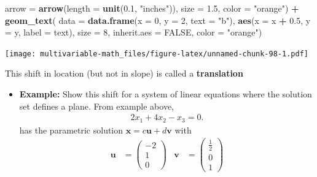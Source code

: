 \documentclass[
]{book}
\newenvironment{Shaded}{\begin{snugshade}}{\end{snugshade}}
\newcommand{\DataTypeTok}[1]{\textcolor[rgb]{0.13,0.29,0.53}{#1}}
\newcommand{\DecValTok}[1]{\textcolor[rgb]{0.00,0.00,0.81}{#1}}
\newcommand{\FloatTok}[1]{\textcolor[rgb]{0.00,0.00,0.81}{#1}}
\newcommand{\KeywordTok}[1]{\textcolor[rgb]{0.13,0.29,0.53}{\textbf{#1}}}
\newcommand{\NormalTok}[1]{#1}
\newcommand{\OperatorTok}[1]{\textcolor[rgb]{0.81,0.36,0.00}{\textbf{#1}}}
\newcommand{\OtherTok}[1]{\textcolor[rgb]{0.56,0.35,0.01}{#1}}
\newcommand{\StringTok}[1]{\textcolor[rgb]{0.31,0.60,0.02}{#1}}
\providecommand{\tightlist}{%
  \setlength{\itemsep}{0pt}\setlength{\parskip}{0pt}}
\theoremstyle{definition}
\theoremstyle{definition}
\theoremstyle{definition}
\theoremstyle{remark}
\begin{document}
\begin{Shaded}
\begin{Highlighting}[]
        \DataTypeTok{arrow =} \KeywordTok{arrow}\NormalTok{(}\DataTypeTok{length =} \KeywordTok{unit}\NormalTok{(}\FloatTok{0.1}\NormalTok{, }\StringTok{"inches"}\NormalTok{)), }
        \DataTypeTok{size =} \FloatTok{1.5}\NormalTok{, }\DataTypeTok{color =} \StringTok{"orange"}\NormalTok{) }\OperatorTok{+}
\StringTok{    }\KeywordTok{geom_text}\NormalTok{(}
        \DataTypeTok{data =} \KeywordTok{data.frame}\NormalTok{(}\DataTypeTok{x =} \DecValTok{0}\NormalTok{, }\DataTypeTok{y =} \DecValTok{2}\NormalTok{, }\DataTypeTok{text =} \StringTok{"b"}\NormalTok{),}
        \KeywordTok{aes}\NormalTok{(}\DataTypeTok{x =}\NormalTok{ x }\OperatorTok{+}\StringTok{ }\FloatTok{0.5}\NormalTok{, }\DataTypeTok{y =}\NormalTok{ y, }\DataTypeTok{label =}\NormalTok{ text), }
        \DataTypeTok{size =} \DecValTok{8}\NormalTok{, }\DataTypeTok{inherit.aes =} \OtherTok{FALSE}\NormalTok{,}
        \DataTypeTok{color =} \StringTok{"orange"}\NormalTok{) }
\end{Highlighting}
\end{Shaded}

\texttt{[image: multivariable-math\_files/figure-latex/unnamed-chunk-98-1.pdf]}

This shift in location (but not in slope) is called a \textbf{translation}

\begin{itemize}
\tightlist
\item
  \textbf{Example:} Show this shift for a system of linear equations where the solution set defines a plane. From example above,
  \[
  \begin{aligned}
  2x_1 + 4 x_2 - x_3 = 0.
  \end{aligned}
  \]
  has the parametric solution \(\mathbf{x} = c \mathbf{u} + d \mathbf{v}\) with
  \[
  \begin{aligned}
  \mathbf{u} & = \begin{pmatrix} -2 \\ 1 \\ 0 \end{pmatrix} &
  \mathbf{v} & = \begin{pmatrix} \frac{1}{2} \\ 0 \\ 1 \end{pmatrix}
  \end{aligned}
  \]
\end{itemize}
\end{document}
